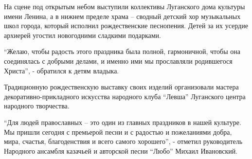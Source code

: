
На сцене под открытым небом выступили коллективы Луганского дома культуры имени
Ленина, а в нижнем пределе храма – сводный детский хор музыкальных школ города,
который исполнил рождественские песнопения. Детей за их усердие архиерей
угостил новогодними сладкими подарками.


\enquote{Желаю, чтобы радость этого праздника была полной, гармоничной, чтобы она
соединялась с добрыми делами, и именно ими мы прославляли родившегося Христа},
- обратился к детям владыка.


Традиционную рождественскую выставку своих изделий организовали мастера
декоративно-прикладного искусства народного клуба \enquote{Левша} Луганского центра
народного творчества.


\enquote{Для людей православных – это один из главных праздников в нашей культуре. Мы
пришли сегодня с премьерой песни и с радостью и пожеланиями добра, мира,
счастья, благоденствия и всего самого хорошего}, - отметил руководитель
Народного ансамбля казачьей и авторской песни \enquote{Любо} Михаил Ивановский.


